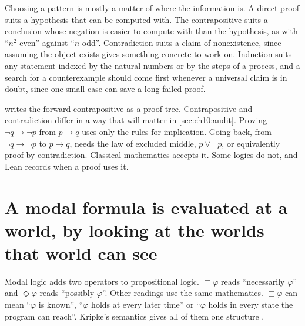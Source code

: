 Choosing a pattern is mostly a matter of where the information is. A direct proof suits a hypothesis that can be computed with. The contrapositive suits a conclusion whose negation is easier to compute with than the hypothesis, as with ``$n^2$ even'' against ``$n$ odd''. Contradiction suits a claim of nonexistence, since assuming the object exists gives something concrete to work on. Induction suits any statement indexed by the natural numbers or by the steps of a process, and a search for a counterexample should come first whenever a universal claim is in doubt, since one small case can save a long failed proof.

 writes the forward contrapositive as a proof tree. Contrapositive and contradiction differ in a way that will matter in \cref{sec:ch10:audit}. Proving $\neg q\to\neg p$ from $p\to q$ uses only the rules for implication. Going back, from $\neg q\to\neg p$ to $p\to q$, needs the law of excluded middle, $p\vee\neg p$, or equivalently proof by contradiction. Classical mathematics accepts it. Some logics do not, and Lean records when a proof uses it.



\section{A modal formula is evaluated at a world, by looking at the worlds that world can see}\label{sec:ch10:kripke}

Modal logic adds two operators to propositional logic. $\Box\varphi$ reads ``necessarily $\varphi$'' and $\Diamond\varphi$ reads ``possibly $\varphi$''. Other readings use the same mathematics. $\Box\varphi$ can mean ``$\varphi$ is known'', ``$\varphi$ holds at every later time'' or ``$\varphi$ holds in every state the program can reach''. Kripke's semantics gives all of them one structure \citep{kripke1963}.

